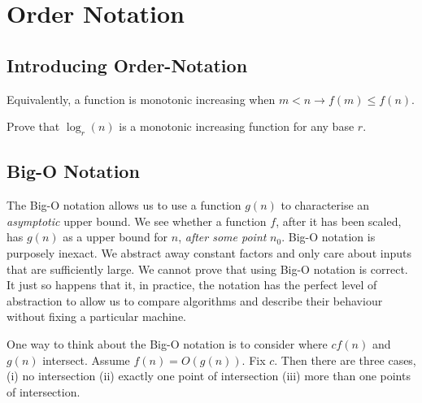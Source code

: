 
\chapter{Order Notation}


\section{Introducing Order-Notation}


Equivalently, a function is monotonic increasing when $m < n \rightarrow f(m) \leqslant f(n)$. 


\begin{example}
Prove that $\log_r(n)$ is a monotonic increasing function for any base $r$.
\end{example}


\section{Big-O Notation}



The Big-O notation allows us to use a function $g(n)$ to characterise an \textit{asymptotic} upper bound. 
We see whether a function $f$, after it has been scaled, 
has $g(n)$ as a upper bound for $n$, \textit{after some point} $n_0$. 
Big-O notation is purposely inexact. We abstract away constant factors 
and only care about inputs that are sufficiently large. We cannot prove that 
using Big-O notation is correct. It just so happens that it, in practice, the 
notation has the perfect level of abstraction to allow us to compare algorithms 
and describe their behaviour without fixing a particular machine. 

\frmrule

\begin{example}

\end{example}

\frmrule

One way to think about the Big-O notation is to consider where $cf(n)$ and $g(n)$ intersect. 
Assume $f(n) = O(g(n))$. Fix $c$. Then there are three cases, (i) no intersection (ii) exactly one point of intersection 
(iii) more than one points of intersection.

